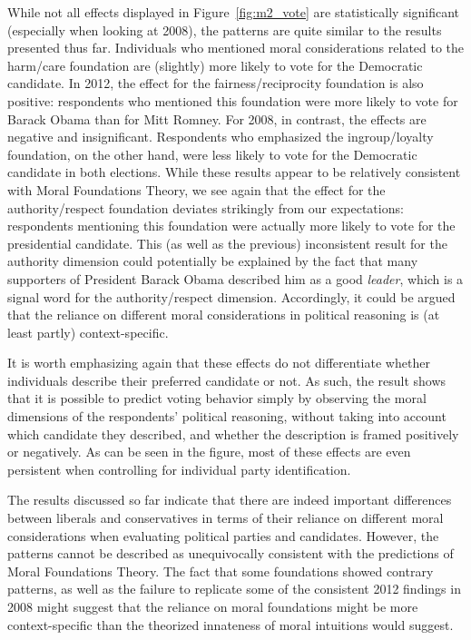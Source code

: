 \documentclass[12pt]{article}
\begin{document}
While not all effects displayed in Figure~\ref{fig:m2_vote} are statistically significant (especially when looking at 2008), the patterns are quite similar to the results presented thus far. Individuals who mentioned moral considerations related to the harm/care foundation are (slightly) more likely to vote for the Democratic candidate. In 2012, the effect for the fairness/reciprocity foundation is also positive: respondents who mentioned this foundation were more likely to vote for Barack Obama than for Mitt Romney. For 2008, in contrast, the effects are negative and insignificant. Respondents who emphasized the ingroup/loyalty foundation, on the other hand, were less likely to vote for the Democratic candidate in both elections. While these results appear to be relatively consistent with Moral Foundations Theory, we see again that the effect for the authority/respect foundation deviates strikingly from our expectations: respondents mentioning this foundation were actually more likely to vote for the presidential candidate. This (as well as the previous) inconsistent result for the authority dimension could potentially be explained by the fact that many supporters of President Barack Obama described him as a good \textit{leader}, which is a signal word for the authority/respect dimension. Accordingly, it could be argued that the reliance on different moral considerations in political reasoning is (at least partly) context-specific.

It is worth emphasizing again that these effects do not differentiate whether individuals describe their preferred candidate or not. As such, the result shows that it is possible to predict voting behavior simply by observing the moral dimensions of the respondents' political reasoning, without taking into account which candidate they described, and whether the description is framed positively or negatively. As can be seen in the figure, most of these effects are even persistent when controlling for individual party identification.

The results discussed so far indicate that there are indeed important differences between liberals and conservatives in terms of their reliance on different moral considerations when evaluating political parties and candidates. However, the patterns cannot be described as unequivocally consistent with the predictions of Moral Foundations Theory. The fact that some foundations showed contrary patterns, as well as the failure to replicate some of the consistent 2012 findings in 2008 might suggest that the reliance on moral foundations might be more context-specific than the theorized innateness of moral intuitions would suggest.
\end{document}
